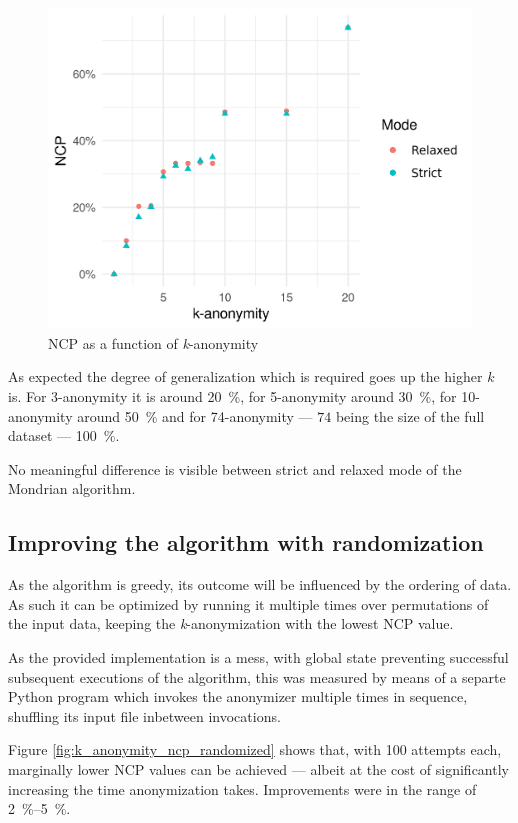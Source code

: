 \documentclass[a4paper]{scrreprt}
\begin{document}
\begin{figure}
		\centering
		\includegraphics[width=\textwidth]{resources/k_anonymity_ncp.png}
		\caption{NCP as a function of \emph{k}-anonymity}
		\label{fig:k_anonymity_ncp}
\end{figure}

As expected the degree of generalization which is required goes up the higher
$k$ is. For 3-anonymity it is around \SI{20}{\percent}, for
5-anonymity around \SI{30}{\percent}, for 10-anonymity around
\SI{50}{\percent} and for 74-anonymity --- $74$ being the size of the
full dataset --- \SI{100}{\percent}.

No meaningful difference is visible between strict and relaxed mode of the
Mondrian algorithm.

\subsection{Improving the algorithm with randomization}

As the algorithm is greedy, its outcome will be influenced by the ordering of
data. As such it can be optimized by running it multiple times over
permutations of the input data, keeping the \emph{k}-anonymization with the
lowest NCP value.

As the provided implementation is a mess, with global state preventing
successful subsequent executions of the algorithm, this was measured by means
of a separte Python program which invokes the anonymizer multiple times in
sequence, shuffling its input file inbetween invocations.

Figure \ref{fig:k_anonymity_ncp_randomized} shows that, with 100 attempts each,
marginally lower NCP values can be achieved --- albeit at the cost of
significantly increasing the time anonymization takes. Improvements were in the
range of \SIrange{2}{5}{\percent}.
\end{document}

